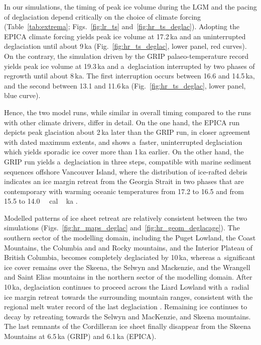 \documentclass[tc, manuscript]{copernicus}
\begin{document}
      In our simulations, the timing of peak ice volume during the LGM and
      the pacing of deglaciation depend critically on the choice of climate
      forcing (Table~\ref{tab:extrema}; Figs.~\ref{fig:lr_ts}
      and~\ref{fig:hr_ts_deglac}). Adopting the EPICA climate forcing yields
      peak ice volume at 17.2\,\unit{ka} and an uninterrupted deglaciation
      until about 9\,\unit{ka} (Fig.~\ref{fig:hr_ts_deglac}, lower panel,
      red curves). On the contrary, the simulation driven by the GRIP
      palaeo-temperature record yields peak ice volume at 19.3\,\unit{ka}
      and a~deglaciation interrupted by two phases of regrowth until about
      8\,\unit{ka}. The first interruption occurs between 16.6 and
      14.5\,\unit{ka}, and the second between 13.1 and 11.6\,\unit{ka}
      (Fig.~\ref{fig:hr_ts_deglac}, lower panel, blue curve).

      Hence, the two model runs, while similar in overall timing compared to
      the runs with other climate drivers, differ in detail. On the one
      hand, the EPICA run depicts peak glaciation about 2\,\unit{ka} later
      than the GRIP run, in closer agreement with dated maximum extents, and
      shows a~faster, uninterrupted deglaciation which yields sporadic ice
      cover more than 1\,\unit{ka} earlier. On the other hand, the GRIP run
      yields a~deglaciation in three steps, compatible with marine sediment
      sequences offshore Vancouver Island, where the distribution of
      ice-rafted debris indicates an ice margin retreat from the Georgia
      Strait in two phases that are contemporary with warming oceanic
      temperatures from 17.2 to 16.5 and from 15.5 to
      14.0\,\unit{\,cal\,ka} \citep{Taylor.etal.2014}.

      Modelled patterns of ice sheet retreat are relatively consistent
      between the two simulations (Figs.~\ref{fig:hr_maps_deglac}
      and~\ref{fig:hr_geom_deglacage}). The southern sector of the modelling
      domain, including the Puget Lowland, the Coast Mountains, the Columbia
      and and Rocky mountains, and the Interior Plateau of British Columbia,
      becomes completely deglaciated by 10\,\unit{ka}, whereas a~significant
      ice cover remains over the Skeena, the Selwyn and Mackenzie, and the
      Wrangell and Saint Elias mountains in the northern sector of the
      modelling domain. After 10\,\unit{ka}, deglaciation continues to
      proceed across the Liard Lowland with a~radial ice margin retreat
      towards the surrounding mountain ranges, consistent with the regional
      melt water record of the last deglaciation \citep{Margold.etal.2013}.
      Remaining ice continues to decay by retreating towards the Selwyn and
      MacKenzie, and Skeena mountains. The last remnants of the Cordilleran
      ice sheet finally disappear from the Skeena Mountains at
      6.5\,\unit{ka} (GRIP) and 6.1\,\unit{ka} (EPICA).
\end{document}
